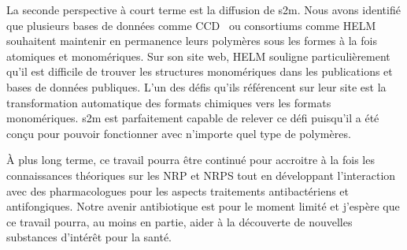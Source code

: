 La seconde perspective à court terme est la diffusion de s2m.
Nous avons identifié que plusieurs bases de données comme CCD~\cite{rahman_small_2009} ou consortiums comme HELM~\cite{_helm_????} souhaitent maintenir en permanence leurs polymères sous les formes à la fois atomiques et monomériques.
Sur son site web, HELM souligne particulièrement qu'il est difficile de trouver les structures monomériques dans les publications et bases de données publiques.
L'un des défis qu'ils référencent sur leur site est la transformation automatique des formats chimiques vers les formats monomériques.
s2m est parfaitement capable de relever ce défi puisqu'il a été conçu pour pouvoir fonctionner avec n'importe quel type de polymères.

À plus long terme, ce travail pourra être continué pour accroitre à la fois les connaissances théoriques sur les NRP et NRPS tout en développant l'interaction avec des pharmacologues pour les aspects traitements antibactériens et antifongiques.
Notre avenir antibiotique est pour le moment limité et j'espère que ce travail pourra, au moins en partie, aider à la découverte de nouvelles substances d'intérêt pour la santé.

























